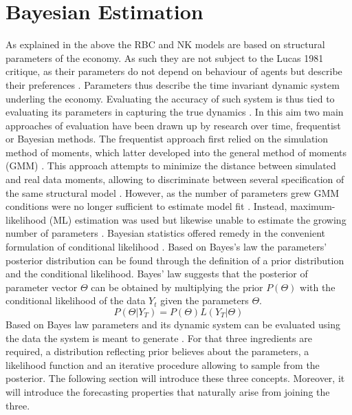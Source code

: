 \documentclass[12pt,a4paper,english]{article} %
\let\oldsection\section
\renewcommand\section{\clearpage\oldsection}
\begin{document}
	\section{Bayesian Estimation}
	As explained in the above the RBC and NK models are based on structural parameters of the economy. As such they are not subject to the Lucas 1981 critique, as their parameters do not depend on behaviour of agents but describe their preferences \cite{lucas_jr_tobin_1981}. Parameters thus describe the time invariant dynamic system underling the economy. Evaluating the accuracy of such system is thus tied to evaluating its parameters in capturing the true dynamics \cite{herbst_bayesian_2016}. In this aim two main approaches of evaluation have been drawn up by research over time, frequentist or Bayesian methods. 
	The frequentist approach first relied on the simulation method of moments, which latter developed into the general method of moments (GMM) \cite{blanchard_solution_1980}. This approach attempts to minimize the distance between simulated and real data moments, allowing to discriminate between several specification of the same structural model \cite{christiano_current_1992}. However, as the number of parameters grew GMM conditions were no longer sufficient to estimate model fit \cite{guerron-quintana_bayesian_2013}. Instead, maximum-likelihood (ML) estimation was used but likewise unable to estimate the growing number of parameters \cite{guerron-quintana_bayesian_2013}. Bayesian statistics offered remedy in the convenient formulation of conditional likelihood \cite{guerron-quintana_bayesian_2013}. Based on Bayes's law the parameters' posterior distribution can be found through the definition of a prior distribution and the conditional likelihood. 
	Bayes' law suggests that the posterior of parameter vector $\Theta$ can be obtained by multiplying the prior $P(\Theta)$ with the conditional likelihood of the data $Y_t$ given the parameters $\Theta$. 
	\begin{equation} \label{eq:blaw}
		P( \Theta | Y_{T}) = P(\Theta) L(Y_{T} | \Theta)
	\end{equation}
	Based on Bayes law parameters and its dynamic system can be evaluated using the data the system is meant to generate \cite{herbst_bayesian_2016}. For that three ingredients are required, a distribution reflecting prior believes about the parameters, a likelihood function and an iterative procedure allowing to sample from the posterior. The following section will introduce these three concepts. Moreover, it will introduce the forecasting properties that naturally arise from joining the three. 
\end{document}
